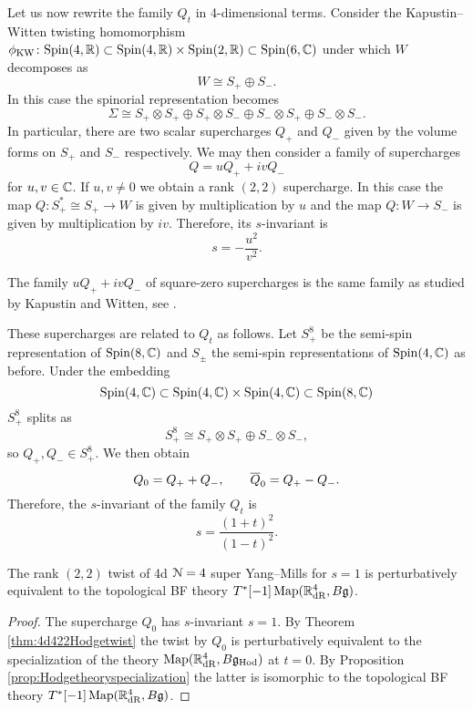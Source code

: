 \documentclass[10pt, oneside]{article}
\newcommand{\Hod}{\mathrm{Hod}}
\begin{document}
Let us now rewrite the family $Q_t$ in 4-dimensional terms. Consider the Kapustin--Witten twisting homomorphism $\phi_{\mathrm{KW}}\colon \Spin(4, \RR)\subset \Spin(4, \RR)\times \Spin(2, \RR)\subset \Spin(6, \CC)$ under which $W$ decomposes as
\[W\cong S_+\oplus S_-.\]
In this case the spinorial representation becomes
\[\Sigma\cong S_+\otimes S_+\oplus S_+\otimes S_-\oplus S_-\otimes S_+\oplus S_-\otimes S_-.\]
In particular, there are two scalar supercharges $Q_+$ and $Q_-$ given by the volume forms on $S_+$ and $S_-$ respectively. We may then consider a family of supercharges
\[Q = u Q_+ + i v Q_-\]
for $u, v\in\CC$. If $u,v\neq 0$ we obtain a rank $(2, 2)$ supercharge. In this case the map $Q\colon S_+^*\cong S_+\rightarrow W$ is given by multiplication by $u$ and the map $Q\colon W\rightarrow S_-$ is given by multiplication by $iv$. Therefore, its $s$-invariant is
\[s = -\frac{u^2}{v^2}.\]

\begin{remark}
The family $uQ_+ + iv Q_-$ of square-zero supercharges is the same family as studied by Kapustin and Witten, see \cite[Section 3.1]{KapustinWitten}.
\end{remark}

These supercharges are related to $Q_t$ as follows. Let $S_+^8$ be the semi-spin representation of $\Spin(8, \CC)$ and $S_\pm$ the semi-spin representations of $\Spin(4, \CC)$ as before. Under the embedding
\[\Spin(4, \CC)\subset \Spin(4, \CC)\times \Spin(4, \CC)\subset \Spin(8, \CC)\]
$S_+^8$ splits as
\[S_+^8\cong S_+\otimes S_+\oplus S_-\otimes S_-,\]
so $Q_+, Q_-\in S_+^8$. We then obtain
\[Q_0 = Q_+ + Q_-,\qquad \Bar{Q}_0 = Q_+ - Q_-.\]
Therefore, the $s$-invariant of the family $Q_t$ is
\begin{equation}
s = \frac{(1+t)^2}{(1-t)^2}.
\label{eq:4d4sinvariant}
\end{equation}

\begin{cor}
The rank $(2, 2)$ twist of 4d $\cN=4$ super Yang--Mills for $s=1$ is perturbatively equivalent to the topological BF theory $T^*[-1]\map(\RR^4_{\mathrm{dR}}, B\fg)$.
\end{cor}
\begin{proof}
The supercharge $Q_0$ has $s$-invariant $s=1$. By Theorem \ref{thm:4d422Hodgetwist} the twist by $Q_0$ is perturbatively equivalent to the specialization of the theory $\map(\RR^4_{\mathrm{dR}}, B\fg_{\Hod})$ at $t=0$. By Proposition \ref{prop:Hodgetheoryspecialization} the latter is isomorphic to the topological BF theory $T^*[-1]\map(\RR^4_{\mathrm{dR}}, B\fg)$.
\end{proof}
\end{document}
